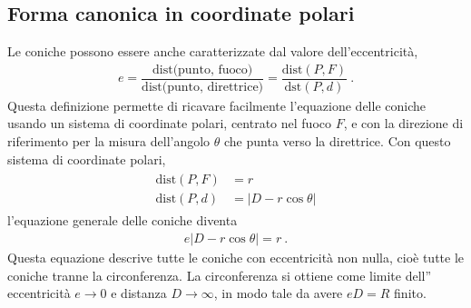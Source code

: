 \documentclass[letterpaper,10pt,italian]{jupyterBook}
\begin{document}
\subsection{Forma canonica in coordinate polari}
\label{\detokenize{ch/analytic_geometry/analytic_geometry_2d/conics-polar:forma-canonica-in-coordinate-polari}}\label{\detokenize{ch/analytic_geometry/analytic_geometry_2d/conics-polar:geometry-analytic-2d-conics-polar}}\label{\detokenize{ch/analytic_geometry/analytic_geometry_2d/conics-polar::doc}}
\sphinxAtStartPar
Le coniche possono essere anche caratterizzate dal valore dell’eccentricità,
\begin{equation*}
\begin{split}e = \dfrac{\text{dist(punto, fuoco)}}{\text{dist(punto, direttrice)}} = \dfrac{\text{dist}(P,F)}{\text{dst}(P,d)} \ .\end{split}
\end{equation*}
\sphinxAtStartPar
Questa definizione permette di ricavare facilmente l’equazione delle coniche usando un sistema di coordinate polari, centrato nel fuoco \(F\), e con la direzione di riferimento per la misura dell’angolo \(\theta\) che punta verso la direttrice. Con questo sistema di coordinate polari,
\begin{equation*}
\begin{split}\begin{aligned}
  \text{dist}(P,F) & = r \\
  \text{dist}(P,d) & = | D - r \cos \theta |
\end{aligned}\end{split}
\end{equation*}
\sphinxAtStartPar
l’equazione generale delle coniche diventa
\begin{equation*}
\begin{split}e \big| D - r \cos \theta \big| = r \ .\end{split}
\end{equation*}
\sphinxAtStartPar
Questa equazione descrive tutte le coniche con eccentricità non nulla, cioè tutte le coniche tranne la circonferenza. La circonferenza si ottiene come limite dell” eccentricità \(e \rightarrow 0\) e distanza \(D \rightarrow \infty\), in modo tale da avere \(e D = R\) finito.



\sphinxstepscope
\end{document}
